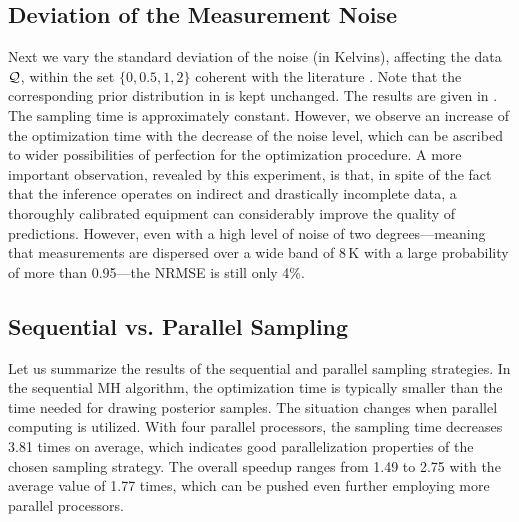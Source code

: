 \subsection{Deviation of the Measurement Noise}
Next we vary the standard deviation of the noise (in Kelvins), affecting the data $\mathcal{Q}$, within the set $\{ 0, 0.5, 1, 2 \}$ coherent with the literature \cite{mesa-martinez2007}. Note that the corresponding prior distribution in  is kept unchanged. The results are given in .
The sampling time is approximately constant. However, we observe an increase of the optimization time with the decrease of the noise level, which can be ascribed to wider possibilities of perfection for the optimization procedure.
A more important observation, revealed by this experiment, is that, in spite of the fact that the inference operates on indirect and drastically incomplete data, a thoroughly calibrated equipment can considerably improve the quality of predictions.
However, even with a high level of noise of two degrees---meaning that measurements are dispersed over a wide band of 8$\,$K with a large probability of more than 0.95---the NRMSE is still only 4\%.

\subsection{Sequential vs. Parallel Sampling}
Let us summarize the results of the sequential and parallel sampling strategies.
In the sequential MH algorithm, the optimization time is typically smaller than the time needed for drawing posterior samples.
The situation changes when parallel computing is utilized. With four parallel processors, the sampling time decreases 3.81 times on average, which indicates good parallelization properties of the chosen sampling strategy.
The overall speedup ranges from 1.49 to 2.75 with the average value of 1.77 times, which can be pushed even further employing more parallel processors.
